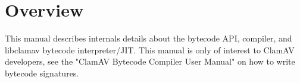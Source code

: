 \chapter{Overview}

This manual describes internals details about the bytecode API, compiler, and
libclamav bytecode interpreter/JIT.
This manual is only of interest to ClamAV developers, see the
"ClamAV Bytecode Compiler User Manual" on how to write bytecode signatures.
